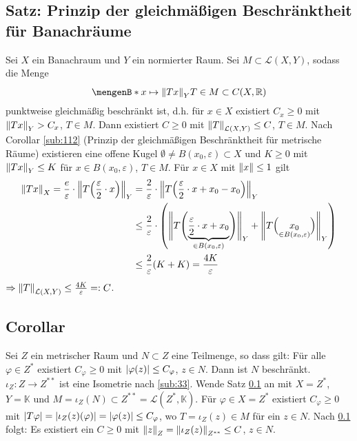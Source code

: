 \subsection{Satz: Prinzip der gleichmäßigen Beschränktheit für Banachräume} %
\label{sub:35}
Sei $X$ ein Banachraum und $Y$ ein normierter Raum. Sei $M \subset \mathcal{L}(X,Y)$, sodass die Menge 
\[
	\set[{x \mapsto \norm[Y]{T x}}]{T \in M \rule{0cm}{1em}} \subset C(X,\mathds{R} )
\]
punktweise gleichmäßig beschränkt ist, d.h. für $x \in X$ existiert $C_x \ge 0$ mit $\norm[Y]{T x} > C_x$, $T \in M$. Dann existiert $C \ge 0$ mit $\norm[\mathcal{L}(X,Y)]{T} \le C$,
$T \in M$.
Nach Corollar \ref{sub:112} (Prinzip der gleichmäßigen Beschränktheit für metrische Räume) existieren eine offene Kugel $\emptyset \not= B(x_0,\varepsilon) \subset X$ und 
$K \ge 0$ mit $\norm[Y]{T x} \le K$ für $x \in B(x_0, \varepsilon)$, $T \in M$. Für $x \in X$ mit $\norm{x} \le 1$ gilt 
\begin{align*}
	\norm[X]{T x} = \frac{e}{\varepsilon} \cdot  \norm[Y]{T \enbrace*{\frac{\varepsilon}{2} \cdot x}} &= \frac{2}{\varepsilon} \cdot 
	\norm[Y]{T \enbrace*{\frac{\varepsilon}{2} \cdot x + x_0 - x_0 } }  \\
	&\le \frac{2}{\varepsilon} \cdot   \enbrace*{ \doppelstrich[\Bigg]{T \enbrace[\Bigg]{\underbrace{\frac{\varepsilon}{2} \cdot x + x_0}_{\in B(x_0,\varepsilon)} } }_Y +
	 \norm[Y]{T  \enbrace[\Big]{\underset{\in B(x_0,\varepsilon)}{x_0}} }} \\
	&\le \frac{2}{\varepsilon} (K+K) = \frac{4K}{\varepsilon}   
\end{align*}
$\Rightarrow \norm[\mathcal{L}(X,Y)]{T} \le \frac{4 K}{\varepsilon} =: C$. \bewende

\subsection{Corollar} %
\label{sub:36}
Sei $Z$ ein metrischer Raum und $N \subset Z$ eine Teilmenge, so dass gilt: Für alle $\varphi \in Z^*$ existiert $C_\varphi \ge 0$ mit $\abs*{\varphi(z)} \le C_\varphi$, 
$z \in N$.  Dann ist $N$ beschränkt.
$\iota_Z : Z \to Z^{**}$ ist eine Isometrie nach \ref{sub:33}. Wende Satz \ref{sub:35} an mit $X=Z^{*}$, $Y=\mathds{K}$ und 
$M = \iota_Z(N) \subset Z^{**}= \mathcal{L}(Z^*,\mathds{K})$.
Für $\varphi \in X = Z^{*}$ existiert $C_\varphi \ge 0$ mit $\abs*{T \varphi} = \abs*{\iota_Z(z) (\varphi)} = \abs*{\varphi(z)} \le C_\varphi$, wo $T= \iota_Z(z) \in M$
für ein $z \in N$. Nach \ref{sub:35} folgt: Es existiert ein $C \ge 0$ mit $\norm[Z]{z} = \norm[Z^{**}]{\iota_Z(z)}  \le C$, $z \in N$. \bewende

